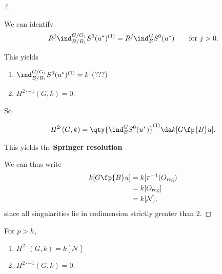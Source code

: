 \begin{proof}[?]

\begin{fact}

We can identify
\begin{align*}  
R^j \ind_{B/B_1}^{G/G_1} S^0(u^*)^{(1)} = R^j \ind_B^G S^0(u^*) \qquad \text{for } j>0
.\end{align*}

\end{fact}

This yields

\begin{enumerate}
\def\labelenumi{\arabic{enumi}.}
\item
  \(\ind_{B/B_1}^{G/G_1} S^0(u^*)^{(1)} = k\) (???)
\item
  \(H^{2\cdot+1}(G, k) = 0\).
\end{enumerate}

So

\begin{align*}  
H^{2\cdot}(G, k) = \qty{ \ind_B^G S^0(u^*)  }^{(1)} \da k[G \fp{B} u]
.\end{align*}

This yields the \textbf{Springer resolution}

\begin{center}\end{center}

We can thus write
\begin{align*}  
k[G\fp{B} u] 
&= k[ \pi^{-1}(O_{\text{reg}}) \\
&= k[O_{\text{reg}}] \\
&= k[\mathcal{N}]
,\end{align*} since all singularities lie in codimension strictly
greater than \(2\).

\end{proof}

\begin{theorem}[F-P, A-J, 1980s]

For \(p>h\),

\begin{enumerate}
\def\labelenumi{\arabic{enumi}.}
\tightlist
\item
  \(H^{2\cdot }(G, k) = k[{\mathcal{N}}]\)
\item
  \(H^{2\cdot + 1}(G, k) = 0\).
\end{enumerate}

\end{theorem}

